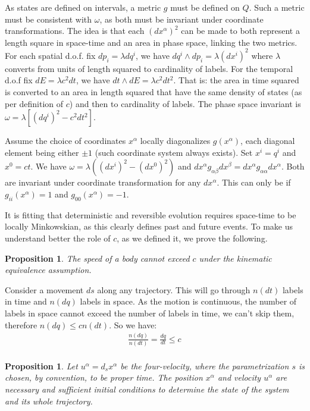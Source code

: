 \documentclass[aps,pra,10pt,twocolumn,floatfix,nofootinbib]{revtex4-1}
\newtheorem{prop}[thm]{Proposition}
\theoremstyle{definition}
\begin{document}
As states are defined on intervals, a metric $g$ must be defined on $Q$. Such a metric must be consistent with $\omega$, as both must be invariant under coordinate transformations. The idea is that each $(dx^\alpha)^2$ can be made to both represent a length square in space-time and an area in phase space, linking the two metrics. For each spatial d.o.f. fix $dp_i=\lambda dq^i$, we have $dq^i \wedge dp_i = \lambda (dx^i)^2$ where $\lambda$ converts from units of length squared to cardinality of labels. For the temporal d.o.f fix $dE = \lambda c^2 dt$, we have $dt \wedge dE = \lambda c^2 dt^2$. That is: the area in time squared is converted to an area in length squared that have the same density of states (as per definition of $c$) and then to cardinality of labels. The phase space invariant is $\omega = \lambda [(dq^i)^2 - c^2 dt^2]$.

Assume the choice of coordinates $x^\alpha$ locally diagonalizes $g(x^\alpha)$, each diagonal element being either $\pm 1$ (such coordinate system always exists). Set $x^i=q^i$ and $x^0=ct$. We have $\omega = \lambda ((dx^i)^2 - (dx^0)^2)$ and $dx^\alpha g_{\alpha \beta} dx^\beta=dx^\alpha g_{\alpha \alpha}dx^\alpha$. Both are invariant under coordinate transformation for any $dx^\alpha$. This can only be if $g_{ii}(x^\alpha)=1$ and $g_{00}(x^\alpha)=-1$.

It is fitting that deterministic and reversible evolution requires space-time to be locally Minkowskian, as this clearly defines past and future events. To make us understand better the role of $c$, as we defined it, we prove the following.

\begin{prop}\label{locallyMinkowski}
The speed of a body cannot exceed $c$ under the kinematic equivalence assumption.
\end{prop}

Consider a movement $ds$ along any trajectory. This will go through $n(dt)$ labels in time and $n(dq)$ labels in space. As the motion is continuous, the number of labels in space cannot exceed the number of labels in time, we can't skip them, therefore $n(dq)\leq c n(dt)$. So we have:
\begin{align*}
\frac{n(dq)}{n(dt)}= \frac{dq}{dt} \leq c \\
\end{align*}

\begin{prop}\label{initialConditions}
Let $u^\alpha = d_s x^\alpha$ be the four-velocity, where the parametrization $s$ is chosen, by convention, to be proper time. The position $x^\alpha$ and velocity $u^\alpha$ are necessary and sufficient initial conditions to determine the state of the system and its whole trajectory.
\end{prop}
\end{document}
